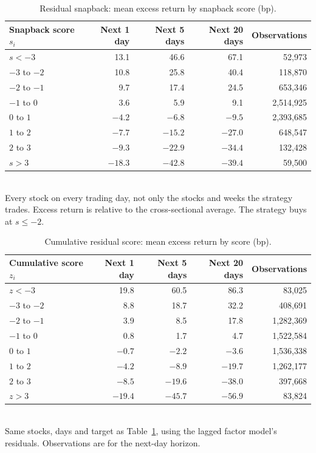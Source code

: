 \documentclass[12pt,letterpaper]{article}
\begin{document}
\begin{table}[H]
\centering
\caption{Residual snapback: mean excess return by snapback score (bp).}
\label{tab:calibration-snap}
\begin{tabular}{lrrrr}
\toprule
Snapback score $s_i$ & Next 1 day & Next 5 days & Next 20 days & Observations \\
\midrule
$s < -3$ & 13.1 & 46.6 & 67.1 & 52,973 \\
$-3$ to $-2$ & 10.8 & 25.8 & 40.4 & 118,870 \\
$-2$ to $-1$ & 9.7 & 17.4 & 24.5 & 653,346 \\
$-1$ to $0$ & 3.6 & 5.9 & 9.1 & 2,514,925 \\
$0$ to $1$ & $-4.2$ & $-6.8$ & $-9.5$ & 2,393,685 \\
$1$ to $2$ & $-7.7$ & $-15.2$ & $-27.0$ & 648,547 \\
$2$ to $3$ & $-9.3$ & $-22.9$ & $-34.4$ & 132,428 \\
$s > 3$ & $-18.3$ & $-42.8$ & $-39.4$ & 59,500 \\
\bottomrule
\end{tabular}
\\[4pt]
\small Every stock on every trading day, not only the stocks and weeks the strategy trades. Excess return is relative to the cross-sectional average. The strategy buys at $s \le -2$.
\end{table}

\begin{table}[H]
\centering
\caption{Cumulative residual score: mean excess return by score (bp).}
\label{tab:calibration-cumulative}
\begin{tabular}{lrrrr}
\toprule
Cumulative score $z_i$ & Next 1 day & Next 5 days & Next 20 days & Observations \\
\midrule
$z < -3$ & 19.8 & 60.5 & 86.3 & 83,025 \\
$-3$ to $-2$ & 8.8 & 18.7 & 32.2 & 408,691 \\
$-2$ to $-1$ & 3.9 & 8.5 & 17.8 & 1,282,369 \\
$-1$ to $0$ & 0.8 & 1.7 & 4.7 & 1,522,584 \\
$0$ to $1$ & $-0.7$ & $-2.2$ & $-3.6$ & 1,536,338 \\
$1$ to $2$ & $-4.2$ & $-8.9$ & $-19.7$ & 1,262,177 \\
$2$ to $3$ & $-8.5$ & $-19.6$ & $-38.0$ & 397,668 \\
$z > 3$ & $-19.4$ & $-45.7$ & $-56.9$ & 83,824 \\
\bottomrule
\end{tabular}
\\[4pt]
\small Same stocks, days and target as Table~\ref{tab:calibration-snap}, using the lagged factor model's residuals. Observations are for the next-day horizon.
\end{table}
\end{document}
